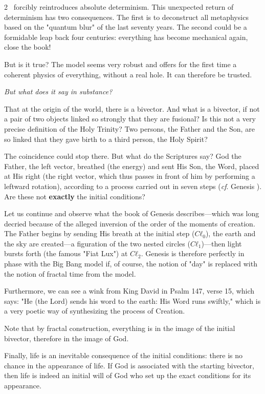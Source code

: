 \begin{multicols}{2}
	\PQ\ forcibly reintroduces absolute determinism. This unexpected return of determinism has two consequences. The first is to deconstruct all metaphysics based on the "quantum blur" of the last seventy years. The second could be a formidable leap back four centuries: everything has become mechanical again, close the book!
	
	But is it true? The model seems very robust and offers for the first time a coherent physics of everything, without a real hole. It can therefore be trusted.
	
	\textit{But what does it say in substance?}
	
	That at the origin of the world, there is a bivector. And what is a bivector, if not a pair of two objects linked so strongly that they are fusional? Is this not a very precise definition of the Holy Trinity? Two persons, the Father and the Son, are so linked that they gave birth to a third person, the Holy Spirit? \cite{aleteia_trinite_ref}
	
	The coincidence could stop there. But what do the Scriptures say? God the Father, the left vector, breathed (the energy) and sent His Son, the Word, placed at His right (the right vector, which thus passes in front of him by performing a leftward rotation), according to a process carried out in seven steps (\textit{cf}. Genesis \cite{aelf_genese1}). Are these not \textbf{exactly} the initial conditions?
	
	Let us continue and observe what the book of Genesis describes—which was long decried because of the alleged inversion of the order of the moments of creation. The Father begins by sending His breath at the initial step ($Cℓ_0$), the earth and the sky are created—a figuration of the two nested circles ($Cℓ_1$)—then light bursts forth (the famous "Fiat Lux") at $Cℓ_2$. Genesis is therefore perfectly in phase with the Big Bang model if, of course, the notion of "day" is replaced with the notion of fractal time from the model.
	
	Furthermore, we can see a wink from King David in Psalm 147, verse 15, which says: "He (the Lord) sends his word to the earth: His Word runs swiftly," \cite{aelf_psaume147} which is a very poetic way of synthesizing the process of Creation.
	
	Note that by fractal construction, everything is in the image of the initial bivector, therefore in the image of God.
	
	Finally, life is an inevitable consequence of the initial conditions: there is no chance in the appearance of life. If God is associated with the starting bivector, then life is indeed an initial will of God who set up the exact conditions for its appearance.
	

\end{multicols}
